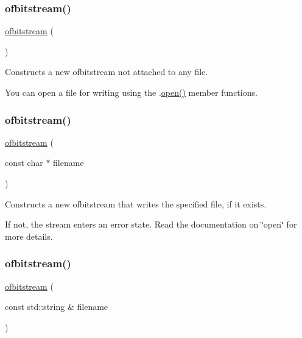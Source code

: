 \subsubsection{\texorpdfstring{ofbitstream()}{ofbitstream()}\hspace{0.1cm}{\footnotesize\ttfamily [1/3]}}
{\footnotesize\ttfamily \mbox{\hyperlink{classofbitstream}{ofbitstream}} (\begin{DoxyParamCaption}{ }\end{DoxyParamCaption})}



Constructs a new ofbitstream not attached to any file. 

You can open a file for writing using the .\mbox{\hyperlink{classofbitstream_a57f80da790b202b27353cd8f8415b382}{open()}} member functions. \mbox{\label{classofbitstream_a4f24be0f7b8620034f41673c9121f87d}} 
\subsubsection{\texorpdfstring{ofbitstream()}{ofbitstream()}\hspace{0.1cm}{\footnotesize\ttfamily [2/3]}}
{\footnotesize\ttfamily \mbox{\hyperlink{classofbitstream}{ofbitstream}} (\begin{DoxyParamCaption}\item[{const char $\ast$}]{filename }\end{DoxyParamCaption})}



Constructs a new ofbitstream that writes the specified file, if it exists. 

If not, the stream enters an error state. Read the documentation on \char`\"{}open\char`\"{} for more details. \mbox{\label{classofbitstream_a3743823306e8043638edf759f8864fab}} 
\subsubsection{\texorpdfstring{ofbitstream()}{ofbitstream()}\hspace{0.1cm}{\footnotesize\ttfamily [3/3]}}
{\footnotesize\ttfamily \mbox{\hyperlink{classofbitstream}{ofbitstream}} (\begin{DoxyParamCaption}\item[{const std\+::string \&}]{filename }\end{DoxyParamCaption})}



